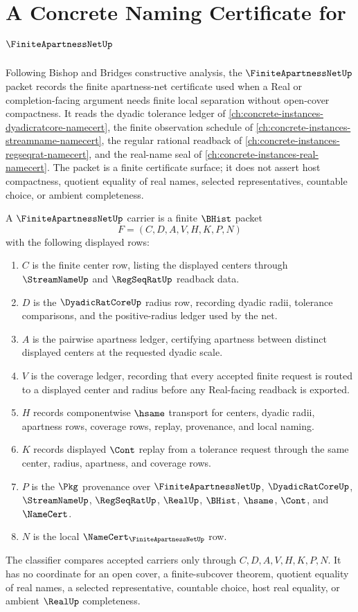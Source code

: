 \chapter{A Concrete Naming Certificate for $\FiniteApartnessNetUp$}
\label{ch:concrete-instances-finite-apartness-net-namecert}

Following Bishop and Bridges constructive analysis, the $\FiniteApartnessNetUp$ packet records the finite apartness-net certificate used when a Real or completion-facing argument needs finite local separation without open-cover compactness. It reads the dyadic tolerance ledger of \autoref{ch:concrete-instances-dyadicratcore-namecert}, the finite observation schedule of \autoref{ch:concrete-instances-streamname-namecert}, the regular rational readback of \autoref{ch:concrete-instances-regseqrat-namecert}, and the real-name seal of \autoref{ch:concrete-instances-real-namecert}. The packet is a finite certificate surface; it does not assert host compactness, quotient equality of real names, selected representatives, countable choice, or ambient completeness.

\begin{definition}
\label{def:finite-apartness-net-carrier}
A $\FiniteApartnessNetUp$ carrier is a finite $\BHist$ packet
$$
F=(C,D,A,V,H,K,P,N)
$$
with the following displayed rows:
\begin{enumerate}
\item $C$ is the finite center row, listing the displayed centers through $\StreamNameUp$ and $\RegSeqRatUp$ readback data.
\item $D$ is the $\DyadicRatCoreUp$ radius row, recording dyadic radii, tolerance comparisons, and the positive-radius ledger used by the net.
\item $A$ is the pairwise apartness ledger, certifying apartness between distinct displayed centers at the requested dyadic scale.
\item $V$ is the coverage ledger, recording that every accepted finite request is routed to a displayed center and radius before any Real-facing readback is exported.
\item $H$ records componentwise $\hsame$ transport for centers, dyadic radii, apartness rows, coverage rows, replay, provenance, and local naming.
\item $K$ records displayed $\Cont$ replay from a tolerance request through the same center, radius, apartness, and coverage rows.
\item $P$ is the $\Pkg$ provenance over $\FiniteApartnessNetUp$, $\DyadicRatCoreUp$, $\StreamNameUp$, $\RegSeqRatUp$, $\RealUp$, $\BHist$, $\hsame$, $\Cont$, and $\NameCert$.
\item $N$ is the local $\NameCert_{\FiniteApartnessNetUp}$ row.
\end{enumerate}
The classifier compares accepted carriers only through $C,D,A,V,H,K,P,N$. It has no coordinate for an open cover, a finite-subcover theorem, quotient equality of real names, a selected representative, countable choice, host real equality, or ambient $\RealUp$ completeness.
\end{definition}

